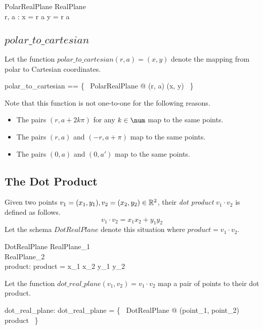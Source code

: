 \documentclass[11pt, oneside]{article}
\begin{document}
\begin{schema}{PolarRealPlane}
	RealPlane \\
	r, a : \R
\where
	x = r \mulR \cosR a
\also
	y = r \mulR \sinR a
\end{schema}

\subsection{$polar\_to\_cartesian$}

Let the function $polar\_to\_cartesian(r, a) = (x, y)$ denote the mapping from
polar to Cartesian coordinates.

\begin{zed}
	polar\_to\_cartesian == \{~ PolarRealPlane @ (r, a) \mapsto (x, y) ~\}
\end{zed}

Note that this function is not one-to-one for the following reasons.
\begin{itemize}
	\item The pairs $(r, a + 2k\pi)$ for any $k \in \num$ map to the same points.
	\item The pairs $(r, a)$ and $(-r, a + \pi)$ map to the same points.
	\item The pairs $(0, a)$ and $(0, a')$ map to the same points.
\end{itemize}

\subsection{The Dot Product}

Given two points $v_1 = (x_1,y_1), v_2 = (x_2, y_2) \in \mathbb{R}^2$, 
their \textit{dot product} $v_1 \cdot v_2$ is defined as follows.
\begin{equation}
	v_1 \cdot v_2 = x_1 x_2 + y_1 y_2
\end{equation}
Let the schema $DotRealPlane$ denote this situation where $product = v_1 \cdot v_2$.

\begin{schema}{DotRealPlane}
	RealPlane_1 \\
	RealPlane_2 \\
	product: \R
\where
	product = x_1 \mulR x_2 \addR y_1 \mulR y_2
\end{schema}

Let the function $dot\_real\_plane(v_1, v_2) = v_1 \cdot v_2$ map a pair of points to their dot product.

\begin{axdef}
	dot\_real\_plane: \Rtwo \cross \Rtwo \fun \R
\where
	dot\_real\_plane = \{~ DotRealPlane @ (point_1, point_2) \mapsto product ~\}
\end{axdef}
\end{document}
